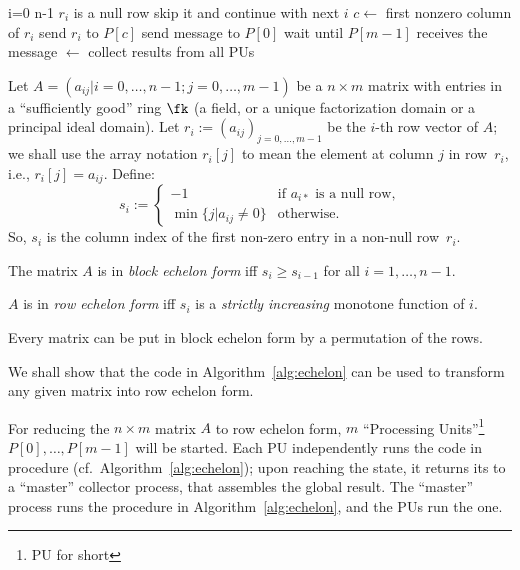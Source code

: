 \begin{Algorithm}
\begin{codebox}
    \li \For i=0 \To n-1                              \label{li:master:read1}
    \li \Do
    \li   \If $r_i$ is a null row 
    \li   \Then
            skip it and continue with next $i$
          \End %
    \li   $c \gets$ first nonzero column of $r_i$
    \li   send $r_i$ to $P[c]$                        \label{li:master:read2}
        \End %
    \li send  message to $P[0]$            \label{li:master:core1}
    \li wait until $P[m-1]$ receives the  message
                                                      \label{li:master:core2}
    \li {} $\gets$ collect  results from all PUs
                                                      \label{li:master:result}
    \li \Return {}                           \label{li:master:end}
  \end{codebox}
\end{Algorithm}

Let $A = (a_{ij} | i = 0, \ldots, n-1; j = 0, \ldots, m-1)$ be a $n
\times m$ matrix with entries in a ``sufficiently good'' ring
$\fk$ (a field, or a unique factorization domain or a principal
ideal domain).  Let $r_i := (a_{ij})_{j = 0, \ldots, m-1}$ be the
$i$-th row vector of $A$; we shall use the array notation $r_i[j]$ to
mean the element at column $j$ in row~$r_i$, i.e., $r_i[j] = a_{ij}$.
Define:
\begin{equation*}
  s_i := 
  \begin{cases}
    -1 &\text{if $a_{i*}$ is a null row,}
    \\
    \min \{j | a_{ij} \not= 0 \} &\text{otherwise.}
  \end{cases}
\end{equation*}
So, $s_i$ is the column index of the first non-zero entry in a
non-null row~$r_i$.
\begin{definition}
  The matrix $A$ is in \emph{block echelon form} iff $s_i
  \geq s_{i-1}$ for all $i = 1, \ldots, n-1$.

  $A$ is in \emph{row echelon form} iff $s_i$ is a
  \emph{strictly increasing} monotone function of $i$.
\end{definition}
Every matrix can be put in block
echelon form by a permutation of the rows.

We shall show that the code in Algorithm~\ref{alg:echelon} can be used
to transform any given matrix into row echelon form.

For reducing the $n\times m$ matrix $A$ to row echelon form,
$m$ ``Processing Units''\footnote{PU for short} $P[0], \ldots, P[m-1]$ will
be started.  Each PU independently runs the code in procedure 
(cf.~Algorithm~\ref{alg:echelon}); upon reaching the
 state, it returns its  to a ``master''
collector process, that assembles the global result.  The ``master''
process runs the  procedure in
Algorithm~\ref{alg:echelon}, and the PUs run the 
one.

